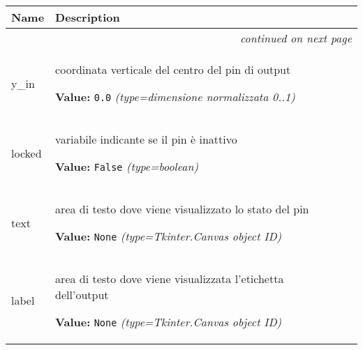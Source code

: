     \vspace{-1cm}
\hspace{\varindent}\begin{longtable}{|p{\varnamewidth}|p{\vardescrwidth}|l}
\cline{1-2}
\cline{1-2} \centering \textbf{Name} & \centering \textbf{Description}& \\
\cline{1-2}
\endhead\cline{1-2}\multicolumn{3}{r}{\small\textit{continued on next page}}\\\endfoot\cline{1-2}
\endlastfoot\raggedright y\-\_\-i\-n\- & \raggedright coordinata verticale del centro del pin di output

\textbf{Value:} 
{\tt 0.0}            {\it (type=dimensione normalizzata 0..1)}&\\
\cline{1-2}
\raggedright l\-o\-c\-k\-e\-d\- & \raggedright variabile indicante se il pin è inattivo

\textbf{Value:} 
{\tt False}            {\it (type=boolean)}&\\
\cline{1-2}
\raggedright t\-e\-x\-t\- & \raggedright area di testo dove viene visualizzato lo stato del pin

\textbf{Value:} 
{\tt None}            {\it (type=Tkinter.Canvas object ID)}&\\
\cline{1-2}
\raggedright l\-a\-b\-e\-l\- & \raggedright area di testo dove viene visualizzata l'etichetta dell'output

\textbf{Value:} 
{\tt None}            {\it (type=Tkinter.Canvas object ID)}&\\
\cline{1-2}
\end{longtable}

